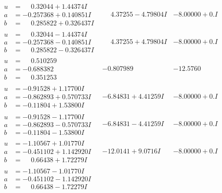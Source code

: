\documentclass[1p]{elsarticle_modified}
\theoremstyle{definition}
\begin{document}
$$\begin{array}{c|c|c}
\begin{aligned}
u &= \phantom{-}0.32044 + 1.44374 I \\
a &= -0.257368 + 0.140851 I \\
b &= \phantom{-}0.285822 + 0.326437 I\end{aligned}
 & \phantom{-}4.37255 - 4.79804 I & -8.00000 + 0. I\phantom{ +0.000000I} \\ \hline\begin{aligned}
u &= \phantom{-}0.32044 - 1.44374 I \\
a &= -0.257368 - 0.140851 I \\
b &= \phantom{-}0.285822 - 0.326437 I\end{aligned}
 & \phantom{-}4.37255 + 4.79804 I & -8.00000 + 0. I\phantom{ +0.000000I} \\ \hline\begin{aligned}
u &= \phantom{-}0.510259\phantom{ +0.000000I} \\
a &= -0.688382\phantom{ +0.000000I} \\
b &= \phantom{-}0.351253\phantom{ +0.000000I}\end{aligned}
 & -0.807989\phantom{ +0.000000I} & -12.5760\phantom{ +0.000000I} \\ \hline\begin{aligned}
u &= -0.91528 + 1.17700 I \\
a &= -0.862893 + 0.570733 I \\
b &= -0.11804 + 1.53800 I\end{aligned}
 & -6.84831 + 4.41259 I & -8.00000 + 0. I\phantom{ +0.000000I} \\ \hline\begin{aligned}
u &= -0.91528 - 1.17700 I \\
a &= -0.862893 - 0.570733 I \\
b &= -0.11804 - 1.53800 I\end{aligned}
 & -6.84831 - 4.41259 I & -8.00000 + 0. I\phantom{ +0.000000I} \\ \hline\begin{aligned}
u &= -1.10567 + 1.01770 I \\
a &= -0.451102 + 1.142920 I \\
b &= \phantom{-}0.66438 + 1.72279 I\end{aligned}
 & -12.0141 + 9.0716 I & -8.00000 + 0. I\phantom{ +0.000000I} \\ \hline\begin{aligned}
u &= -1.10567 - 1.01770 I \\
a &= -0.451102 - 1.142920 I \\
b &= \phantom{-}0.66438 - 1.72279 I\end{aligned}

\end{array}$$
\end{document}
